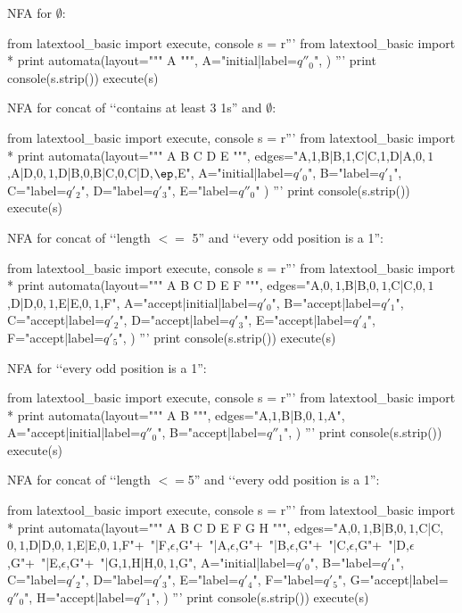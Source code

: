 NFA for $\emptyset$:
\begin{python}
from latextool_basic import execute, console
s = r'''
from latextool_basic import * 
print automata(layout="""
A
""",
A="initial|label=$q''_0$",
)
'''
print console(s.strip())
execute(s)
\end{python}



NFA for concat of \lq\lq contains at least 3 1s'' and $\emptyset$:
\begin{python}
from latextool_basic import execute, console
s = r'''
from latextool_basic import * 
print automata(layout="""
A B C D   E
""",
edges="A,1,B|B,1,C|C,1,D|A,$0,1$,A|D,$0,1$,D|B,0,B|C,0,C|D,$\ep$,E",
A="initial|label=$q'_0$",
B="label=$q'_1$",
C="label=$q'_2$",
D="label=$q'_3$",
E="label=$q''_0$"
)
'''
print console(s.strip())
execute(s)
\end{python}




NFA for concat of \lq\lq length $<=$ 5'' and 
\lq\lq every odd position is a 1'':
\begin{python}
from latextool_basic import execute, console
s = r'''
from latextool_basic import * 
print automata(layout="""
A B C D E F
""",
edges="A,$0,1$,B|B,$0,1$,C|C,$0,1$,D|D,$0,1$,E|E,$0,1$,F",
A="accept|initial|label=$q'_0$",
B="accept|label=$q'_1$",
C="accept|label=$q'_2$",
D="accept|label=$q'_3$",
E="accept|label=$q'_4$",
F="accept|label=$q'_5$",              
)
'''
print console(s.strip())
execute(s)
\end{python}




NFA for \lq\lq every odd position is a 1'':
\begin{python}
from latextool_basic import execute, console
s = r'''
from latextool_basic import * 
print automata(layout="""
A B
""",
edges="A,$1$,B|B,$0,1$,A",
A="accept|initial|label=$q''_0$",
B="accept|label=$q''_1$",
)
'''
print console(s.strip())
execute(s)
\end{python}




NFA for concat of \lq\lq length $<=$5'' and \lq\lq every odd position is a 1'':
\begin{python}
from latextool_basic import execute, console
s = r'''
from latextool_basic import * 
print automata(layout="""
A B C D E F G H
""",
edges="A,$0,1$,B|B,$0,1$,C|C,$0,1$,D|D,$0,1$,E|E,$0,1$,F"+\
 "|F,$\epsilon$,G"+\
 "|A,$\epsilon$,G"+\
 "|B,$\epsilon$,G"+\
 "|C,$\epsilon$,G"+\
 "|D,$\epsilon$,G"+\
 "|E,$\epsilon$,G"+\
 "|G,$1$,H|H,$0,1$,G",
A="initial|label=$q'_0$",
B="label=$q'_1$",
C="label=$q'_2$",
D="label=$q'_3$",
E="label=$q'_4$",
F="label=$q'_5$",
G="accept|label=$q''_0$",
H="accept|label=$q''_1$",
)
'''
print console(s.strip())
execute(s)
\end{python}





